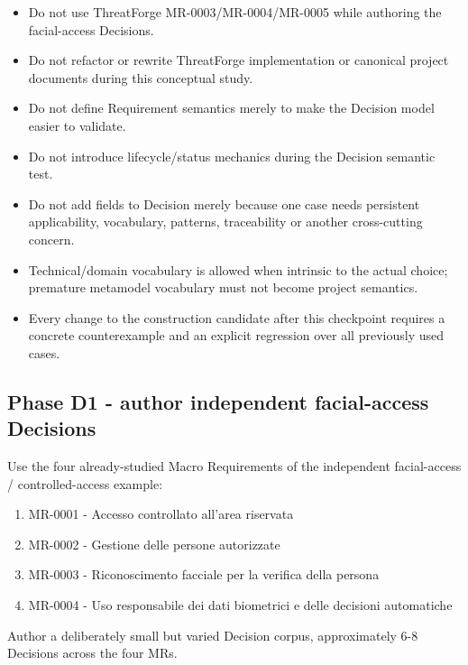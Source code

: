 \documentclass[
  10pt,
]{article}
\providecommand{\tightlist}{%
  \setlength{\itemsep}{0pt}\setlength{\parskip}{0pt}}
\begin{document}
\begin{itemize}
\tightlist
\item
  Do not use ThreatForge MR-0003/MR-0004/MR-0005 while authoring the
  facial-access Decisions.
\item
  Do not refactor or rewrite ThreatForge implementation or canonical
  project documents during this conceptual study.
\item
  Do not define Requirement semantics merely to make the Decision model
  easier to validate.
\item
  Do not introduce lifecycle/status mechanics during the Decision
  semantic test.
\item
  Do not add fields to Decision merely because one case needs persistent
  applicability, vocabulary, patterns, traceability or another
  cross-cutting concern.
\item
  Technical/domain vocabulary is allowed when intrinsic to the actual
  choice; premature metamodel vocabulary must not become project
  semantics.
\item
  Every change to the construction candidate after this checkpoint
  requires a concrete counterexample and an explicit regression over all
  previously used cases.
\end{itemize}

\subsection{Phase D1 - author independent facial-access
Decisions}\label{phase-d1---author-independent-facial-access-decisions}

Use the four already-studied Macro Requirements of the independent
facial-access / controlled-access example:

\begin{enumerate}
\def\labelenumi{\arabic{enumi}.}
\tightlist
\item
  MR-0001 - Accesso controllato all'area riservata
\item
  MR-0002 - Gestione delle persone autorizzate
\item
  MR-0003 - Riconoscimento facciale per la verifica della persona
\item
  MR-0004 - Uso responsabile dei dati biometrici e delle decisioni
  automatiche
\end{enumerate}

Author a deliberately small but varied Decision corpus, approximately
6-8 Decisions across the four MRs.
\end{document}
